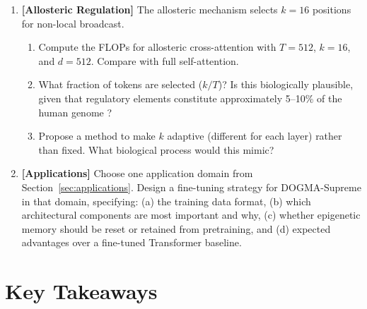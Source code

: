 \begin{enumerate}[label=\textbf{14.\arabic*.}, leftmargin=2.5em]
\item \textbf{[Allosteric Regulation]} The allosteric mechanism selects $k = 16$ positions for non-local broadcast.
\begin{enumerate}[label=(\alph*)]
  \item Compute the FLOPs for allosteric cross-attention with $T = 512$, $k = 16$, and $d = 512$. Compare with full self-attention.
  \item What fraction of tokens are selected ($k/T$)? Is this biologically plausible, given that regulatory elements constitute approximately 5--10\% of the human genome \citep{encode2012}?
  \item Propose a method to make $k$ adaptive (different for each layer) rather than fixed. What biological process would this mimic?
\end{enumerate}

\item \textbf{[Applications]} Choose one application domain from Section~\ref{sec:applications}. Design a fine-tuning strategy for DOGMA-Supreme in that domain, specifying: (a) the training data format, (b) which architectural components are most important and why, (c) whether epigenetic memory should be reset or retained from pretraining, and (d) expected advantages over a fine-tuned Transformer baseline.

\end{enumerate}

\section{Key Takeaways}

